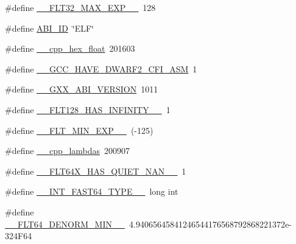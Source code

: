 \begin{DoxyCompactItemize}
\item 
\#define \hyperlink{cmake-build-debug_2babel__client__autogen_2moc__predefs_8h_a731bd57ce12918b6118b6a3e37c20d8e}{\+\_\+\+\_\+\+F\+L\+T32\+\_\+\+M\+A\+X\+\_\+\+E\+X\+P\+\_\+\+\_\+}~128
\item 
\#define \hyperlink{cmake-build-debug_2babel__client__autogen_2moc__predefs_8h_a12ae39ceaadaa474ba09d20fba083f68}{A\+B\+I\+\_\+\+ID}~\char`\"{}E\+LF\char`\"{}
\item 
\#define \hyperlink{cmake-build-debug_2babel__client__autogen_2moc__predefs_8h_a0958474253d23ca2c87e817c16f74eda}{\+\_\+\+\_\+cpp\+\_\+hex\+\_\+float}~201603
\item 
\#define \hyperlink{cmake-build-debug_2babel__client__autogen_2moc__predefs_8h_a89cfc45cff96747b74ae03bdb2310814}{\+\_\+\+\_\+\+G\+C\+C\+\_\+\+H\+A\+V\+E\+\_\+\+D\+W\+A\+R\+F2\+\_\+\+C\+F\+I\+\_\+\+A\+SM}~1
\item 
\#define \hyperlink{cmake-build-debug_2babel__client__autogen_2moc__predefs_8h_aee5d0901405056d87e3bd47fee83128d}{\+\_\+\+\_\+\+G\+X\+X\+\_\+\+A\+B\+I\+\_\+\+V\+E\+R\+S\+I\+ON}~1011
\item 
\#define \hyperlink{cmake-build-debug_2babel__client__autogen_2moc__predefs_8h_a01763e0801406de2e88b94f4ad1298de}{\+\_\+\+\_\+\+F\+L\+T128\+\_\+\+H\+A\+S\+\_\+\+I\+N\+F\+I\+N\+I\+T\+Y\+\_\+\+\_\+}~1
\item 
\#define \hyperlink{cmake-build-debug_2babel__client__autogen_2moc__predefs_8h_acd7b9de9b6bd817027cb37ec6c82cba9}{\+\_\+\+\_\+\+F\+L\+T\+\_\+\+M\+I\+N\+\_\+\+E\+X\+P\+\_\+\+\_\+}~(-\/125)
\item 
\#define \hyperlink{cmake-build-debug_2babel__client__autogen_2moc__predefs_8h_a5eeda02831b3d7147a1a90f2d52a6228}{\+\_\+\+\_\+cpp\+\_\+lambdas}~200907
\item 
\#define \hyperlink{cmake-build-debug_2babel__client__autogen_2moc__predefs_8h_a5cef009cb95e257c235cd3e953bae15f}{\+\_\+\+\_\+\+F\+L\+T64\+X\+\_\+\+H\+A\+S\+\_\+\+Q\+U\+I\+E\+T\+\_\+\+N\+A\+N\+\_\+\+\_\+}~1
\item 
\#define \hyperlink{cmake-build-debug_2babel__client__autogen_2moc__predefs_8h_a65967d857259eb36c9546a512f2ab4b5}{\+\_\+\+\_\+\+I\+N\+T\+\_\+\+F\+A\+S\+T64\+\_\+\+T\+Y\+P\+E\+\_\+\+\_\+}~long int
\item 
\#define \hyperlink{cmake-build-debug_2babel__client__autogen_2moc__predefs_8h_a9b18cde45e680760b3a997b0b1884408}{\+\_\+\+\_\+\+F\+L\+T64\+\_\+\+D\+E\+N\+O\+R\+M\+\_\+\+M\+I\+N\+\_\+\+\_\+}~4.\+94065645841246544176568792868221372e-\/324\+F64
\item 

\end{DoxyCompactItemize}
